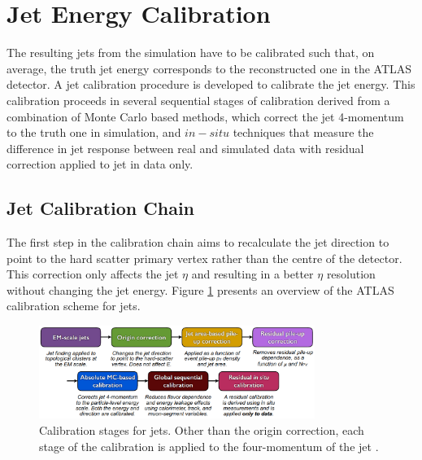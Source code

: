 \section{Jet Energy Calibration}
\label{Jet:Cal}
The resulting jets from the simulation have to be calibrated such that, on average, the truth jet energy corresponds to the reconstructed one in the ATLAS detector. A jet calibration procedure is developed to calibrate the jet energy. This calibration proceeds in several sequential stages of calibration derived from a combination of Monte Carlo based methods, which correct the jet 4-momentum to the truth one in simulation, and $in-situ$ techniques that measure the difference in jet response between real and simulated data with residual correction applied to jet in data only.

\subsection{Jet Calibration Chain}
\label{Jet:Cal:chain}
 The first step in the calibration chain aims to recalculate the jet direction to point to the hard scatter primary vertex rather than the centre of the detector. This correction only affects the jet $\eta$ and resulting in a better $\eta$ resolution without changing the jet energy. Figure \ref{fig:Jet:Cal:chain} presents an overview of the ATLAS calibration scheme for jets.
\begin{figure}[htbp]
     \centering
     \includegraphics[width=0.8\textwidth]{Ch4/Img/calibration_chain.png}
     \caption{Calibration stages for jets. Other than the origin correction, each stage of the calibration is applied to the four-momentum of the jet \cite{JES_Sys_13_TeV}.}
     \label{fig:Jet:Cal:chain}
 \end{figure}

